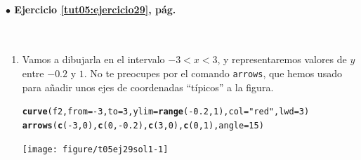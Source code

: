 \documentclass[10pt,a4paper]{article}\usepackage[]{graphicx}\usepackage[]{color}
\makeatletter
\newcommand{\hlnum}[1]{\textcolor[rgb]{0.686,0.059,0.569}{#1}}%
\newcommand{\hlstr}[1]{\textcolor[rgb]{0.192,0.494,0.8}{#1}}%
\newcommand{\hlopt}[1]{\textcolor[rgb]{0,0,0}{#1}}%
\newcommand{\hlstd}[1]{\textcolor[rgb]{0.345,0.345,0.345}{#1}}%
\newcommand{\hlkwc}[1]{\textcolor[rgb]{0.333,0.667,0.333}{#1}}%
\newcommand{\hlkwd}[1]{\textcolor[rgb]{0.737,0.353,0.396}{\textbf{#1}}}%
\newenvironment{kframe}{%
 \def\at@end@of@kframe{}%
 \ifinner\ifhmode%
  \def\at@end@of@kframe{\end{minipage}}%
  \begin{minipage}{\columnwidth}%
 \fi\fi%
 \def\FrameCommand##1{\hskip\@totalleftmargin \hskip-\fboxsep
 \colorbox{shadecolor}{##1}\hskip-\fboxsep
     \hskip-\linewidth \hskip-\@totalleftmargin \hskip\columnwidth}%
 \MakeFramed {\advance\hsize-\width
   \@totalleftmargin\z@ \linewidth\hsize
   \@setminipage}}%
 {\par\unskip\endMakeFramed%
 \at@end@of@kframe}
\newenvironment{knitrout}{}{} %
\makeatother
\begin{document}
\paragraph{\bf $\bullet$ Ejercicio \ref{tut05:ejercicio29}, pág. \pageref{tut05:ejercicio29}}
\label{tut05:ejercicio29:sol}\quad\\
\begin{enumerate}
  \item Vamos a dibujarla en el intervalo $-3 < x <3$, y representaremos valores de $y$ entre $-0.2$ y $1$. No te preocupes por el comando {\tt arrows}, que hemos usado para añadir unos ejes de coordenadas ``típicos'' a la figura.
\begin{knitrout}
\color{fgcolor}\begin{kframe}
\begin{alltt}
\hlkwd{curve}\hlstd{(f2,} \hlkwc{from}\hlstd{=}\hlopt{-}\hlnum{3}\hlstd{,} \hlkwc{to}\hlstd{=}\hlnum{3}\hlstd{,} \hlkwc{ylim}\hlstd{=}\hlkwd{range}\hlstd{(}\hlopt{-}\hlnum{0.2}\hlstd{,} \hlnum{1}\hlstd{),} \hlkwc{col}\hlstd{=}\hlstr{"red"}\hlstd{,} \hlkwc{lwd}\hlstd{=}\hlnum{3}\hlstd{)}
\hlkwd{arrows}\hlstd{(}\hlkwd{c}\hlstd{(}\hlopt{-}\hlnum{3}\hlstd{,}\hlnum{0}\hlstd{),} \hlkwd{c}\hlstd{(}\hlnum{0}\hlstd{,} \hlopt{-}\hlnum{0.2}\hlstd{),} \hlkwd{c}\hlstd{(}\hlnum{3}\hlstd{,}\hlnum{0}\hlstd{),} \hlkwd{c}\hlstd{(}\hlnum{0}\hlstd{,}\hlnum{1}\hlstd{),} \hlkwc{angle}\hlstd{=}\hlnum{15}\hlstd{)}
\end{alltt}
\end{kframe}
\texttt{[image: figure/t05ej29sol1-1]} 


\end{knitrout}
\end{enumerate}
\end{document}
